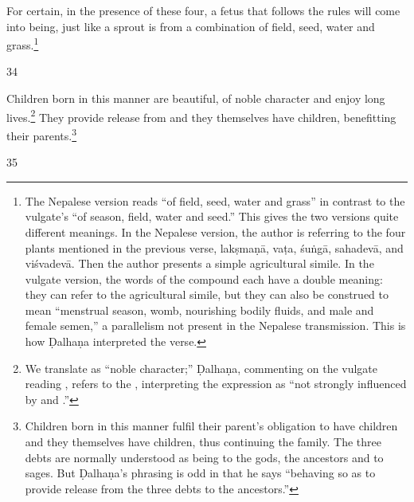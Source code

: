 \begin{translation}
\begin{sloka}
    For certain, in the presence of these four, a fetus that follows
the rules will come into being, just like a sprout is from a
combination of field, seed, water and grass.\footnote{The Nepalese
    version reads  “of field, seed, water
    and grass” in contrast to the vulgate's 
    “of season, field, water and seed.” This gives the two versions
    quite different meanings. In the Nepalese version, the author is
    referring to the four plants mentioned in the previous verse,
    \gls{lakṣmaṇā}, \gls{vaṭa}, \gls{śuṅgā}, \gls{sahadevā}, and
    \gls{viśvadevā}.  Then the author presents a simple agricultural
    simile.  In the vulgate version, the words of the compound each
    have a double meaning: they can refer to the agricultural simile,
    but they can also be construed to mean “menstrual season, womb,
    nourishing bodily fluids, and male and female semen,” a
    parallelism not present in the Nepalese transmission.   This is
    how Ḍalhaṇa interpreted the verse.}
\end{sloka}

\item[34] 

Children born in this manner are beautiful, of noble character and
enjoy long lives.\footnote{We translate  as “noble
    character;” Ḍalhaṇa, commenting on the vulgate reading
    , refers to the , interpreting the
    expression as “not strongly influenced by  and
    .”}  They provide release from  and
    they themselves have children, benefitting their parents.\footnote{Children 
    born in this manner
        fulfil their parent's obligation to have children and they themselves
        have children, thus continuing the family.  The three debts are
        normally understood as being to the gods, the ancestors and to sages.
        But Ḍalhaṇa's phrasing is odd in that he says
         “behaving so as to provide release
        from the three debts to the ancestors.”} 

\item[35]


\end{translation}
